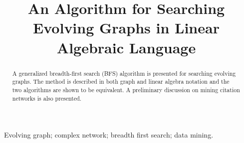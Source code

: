 \documentclass[11pt,conference,compsocconf]{IEEEtran}
\theoremstyle{definition}
\begin{document}
%
\title{An Algorithm for Searching Evolving Graphs in Linear Algebraic Language}


\author{
\and
{}
}

\maketitle

\begin{abstract}
A generalized breadth-first search (BFS) algorithm is presented for
searching evolving graphs.
The method is described in both graph and linear algebra notation and
the two algorithms are shown to be equivalent.
A preliminary discussion on mining citation networks is also presented.
\end{abstract}

\begin{IEEEkeywords}
~Evolving graph; complex network; breadth first search; data mining.
\end{IEEEkeywords}

%
\IEEEpeerreviewmaketitle
\end{document}
